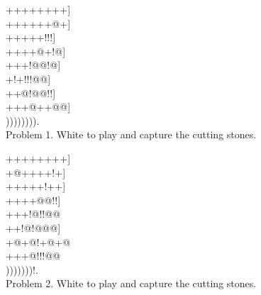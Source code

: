 \documentclass[mcrownvopaper,10pt,twopage,onecolumn,draft,showtrims]{memoir}
\begin{document}
\begin{figure}[ht]
    \begin{minipage}[c]{0.5\linewidth}
        \centering    
        {\gnos%
        ++++++++]\\
        ++++++@+]\\
        +++++!!!]\\
        ++++@+!@]\\
        +++!@@!@]\\
        +!+!!!@@]\\
        ++@!@@!!]\\
        +++@++@@]\\
        )))))))).\\
        }
        Problem 1. White to play and capture the cutting stones.
    \end{minipage}%
    \begin{minipage}[c]{0.5\linewidth}
        \centering    
        {\gnos%
        ++++++++]\\
        +@++++!+]\\
        +++++!++]\\
        ++++@@!!]\\
        +++!@!!@@\\
        ++!@!@@@]\\
        +@+@!+@+@\\
        +++@!!!@@\\
        )))))))!.\\
        }
        Problem 2. White to play and capture the cutting stones.
    \end{minipage}
\end{figure}
\end{document}
